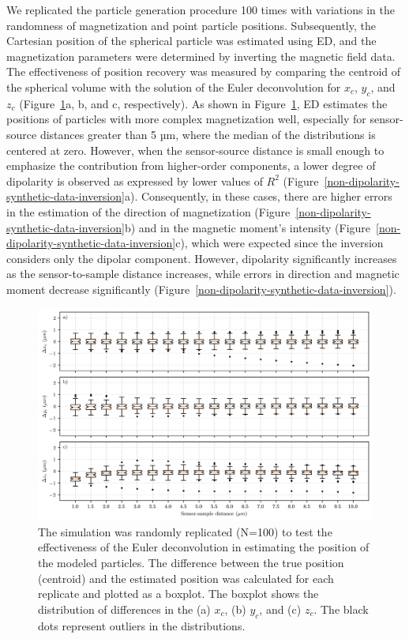 We replicated the particle generation procedure 100 times with variations in the randomness of magnetization and point particle positions. Subsequently, the Cartesian position of the spherical particle was estimated using ED, and the magnetization parameters were determined by inverting the magnetic field data. The effectiveness of position recovery was measured by comparing the centroid of the spherical volume with the solution of the Euler deconvolution for $x_c$, $y_c$, and $z_c$ (Figure~\ref{non-dipolarity-synthetic-data-positioning}a, b, and c, respectively). As shown in Figure~\ref{non-dipolarity-synthetic-data-positioning}, ED estimates the positions of particles with more complex magnetization well, especially for sensor-source distances greater than 5 µm, where the median of the distributions is centered at zero. However, when the sensor-source distance is small enough to emphasize the contribution from higher-order components, a lower degree of dipolarity is observed as expressed by lower values of $R^2$ (Figure~\ref{non-dipolarity-synthetic-data-inversion}a). Consequently, in these cases, there are higher errors in the estimation of the direction of magnetization (Figure~\ref{non-dipolarity-synthetic-data-inversion}b) and in the magnetic moment's intensity (Figure~\ref{non-dipolarity-synthetic-data-inversion}c), which were expected since the inversion considers only the dipolar component. However, dipolarity significantly increases as the sensor-to-sample distance increases, while errors in direction and magnetic moment decrease significantly (Figure~\ref{non-dipolarity-synthetic-data-inversion}).

\begin{figure}[tb!]
  \centering
  \includegraphics[width=1\linewidth]{figures/non-dipolarity-synthetic-positioning.png}
  \caption{The simulation was randomly replicated (N=100) to test the effectiveness of the Euler deconvolution in estimating the position of the modeled particles. The difference between the true position (centroid) and the estimated position was calculated for each replicate and plotted as a boxplot. The boxplot shows the distribution of differences in the (a) $x_c$, (b) $y_c$, and (c) $z_c$. The black dots represent outliers in the distributions.}
  \label{non-dipolarity-synthetic-data-positioning}
\end{figure}

